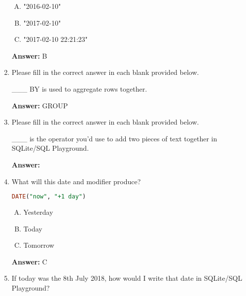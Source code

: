 \documentclass[12pt]{article}
\begin{document}
\begin{enumerate}[1.]
    \bigskip

    \begin{enumerate}[A.]
        \item "2016-02-10"
        \item "2017-02-10"
        \item "2017-02-10 22:21:23"
    \end{enumerate}

    \bigskip

    \textbf{Answer:} B

    \item

    Please fill in the correct answer in each blank provided below.

    \bigskip

    \_\_\_  BY is used to aggregate rows together.

    \bigskip

    \textbf{Answer:} GROUP

    \item

    Please fill in the correct answer in each blank provided below.

    \bigskip

    \_\_\_  is the operator you'd use to add two pieces of text together in SQLite/SQL Playground.

    \bigskip

    \textbf{Answer:} \textbar \textbar

    \item

    What will this date and modifier produce?

    \bigskip

    \begin{lstlisting}[language=SQL]
    DATE("now", "+1 day")
    \end{lstlisting}

    \begin{enumerate}[A.]
        \item Yesterday
        \item Today
        \item Tomorrow
    \end{enumerate}

    \bigskip

    \textbf{Answer:} C

    \item

    If today was the 8th July 2018, how would I write that date in SQLite/SQL Playground?


\end{enumerate}
\end{document}
